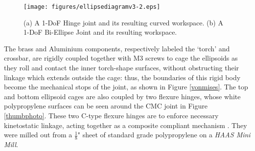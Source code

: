 \documentclass[journal]{IEEEtran}
\begin{document}
\begin{figure}
	\centering
	\texttt{[image: figures/ellipsediagramv3-2.eps]}
	\caption{(a) A 1-DoF Hinge joint and its resulting curved workspace. (b) A 1-DoF Bi-Ellipse Joint and its resulting workspace.}
 \label{2dc}
\end{figure}

The brass and Aluminium components, respectively labeled the `torch' and crossbar, are rigidly coupled together with M3 screws to cage the ellipsoids as they roll and contact the inner torch-shape surfaces, without obstructing their linkage which extends outside the cage: thus, the boundaries of this rigid body become the mechanical stops of the joint, as shown in Figure \ref{vonmises}. The top and bottom ellipsoid cages are also coupled by two flexure hinges, whose white polypropylene surfaces can be seen around the CMC joint in Figure \ref{thumbphoto}. These two C-type flexure hinges are to enforce necessary kinetostatic linkage, acting together as a composite compliant mechanism \cite{fhdef}. They were milled out from a \(\frac{1}{8}\)" sheet of standard grade polypropylene on a {\it HAAS Mini Mill}. 


\end{document}
